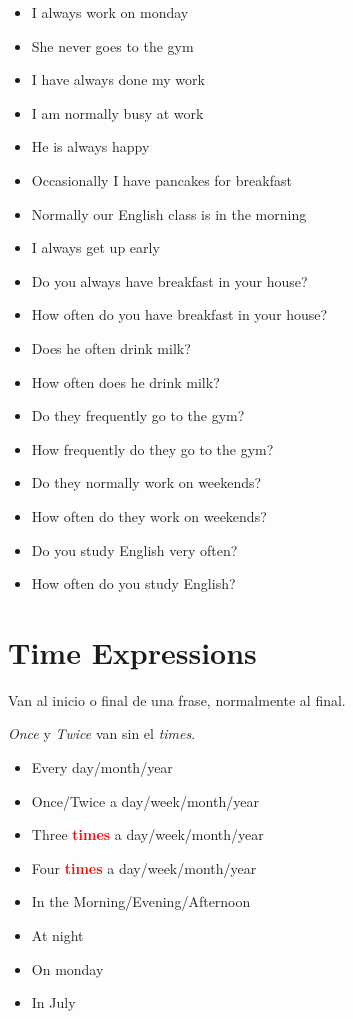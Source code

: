 \documentclass{elegantbook}
\begin{document}
        \begin{example}
            \begin{itemize}
                \item I always work on monday
                \item She never goes to the gym
                \item I have always done my work
                \item I am normally busy at work
                \item He is always happy
                \item Occasionally I have pancakes for breakfast
                \item Normally our English class is in the morning
                \item I always get up early
                \item Do you always have breakfast in your house?
                \item How often do you have breakfast in your house?
                \item Does he often drink milk?
                \item How often does he drink milk?
                \item Do they frequently go to the gym?
                \item How frequently do they go to the gym?
                \item Do they normally work on weekends?
                \item How often do they work on weekends?
                \item Do you study English very often?
                \item How often do you study English?
            \end{itemize}
        \end{example}
        \section{Time Expressions}
        \begin{property}
            Van al inicio o final de una frase, normalmente al final.
        \end{property}
        \begin{property}
            \emph{Once} y \emph{Twice} van sin el \emph{times}.
        \end{property}
        \begin{itemize}
            \item Every day/month/year
            \item Once/Twice a day/week/month/year 
            \item Three \textcolor{red}{\textbf{times}} a day/week/month/year
            \item Four  \textcolor{red}{\textbf{times}} a day/week/month/year
            \item In the Morning/Evening/Afternoon
            \item At night
            \item On monday
            \item In July
        \end{itemize}
\end{document}
